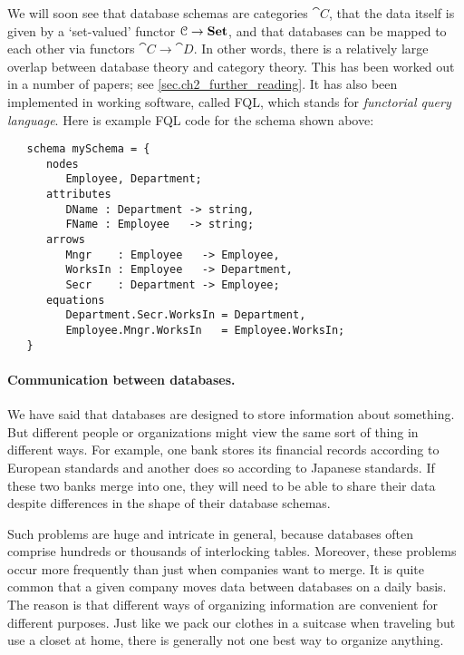 \documentclass[7Sketches]{subfiles}
\begin{document}
We will soon see that database schemas are categories $\cat{C}$, that the data itself is given by a `set-valued' functor $\mathcal{C}\to\mathbf{Set}$, and that databases can be mapped to each other via functors $\cat{C}\to\cat{D}$. In other words, there is a relatively large overlap between database theory and category theory. This has been worked out in a number of papers; see \cref{sec.ch2_further_reading}. It has also been implemented in working software, called FQL, which stands for \emph{functorial query language}. Here is example FQL code for the schema shown above:

\footnotesize
\begin{verbatim}
   schema mySchema = { 
      nodes
         Employee, Department;
      attributes
         DName : Department -> string,
         FName : Employee   -> string;
      arrows
         Mngr    : Employee   -> Employee,
         WorksIn : Employee   -> Department,
         Secr    : Department -> Employee;
      equations  
         Department.Secr.WorksIn = Department,
         Employee.Mngr.WorksIn   = Employee.WorksIn;
   }
\end{verbatim}
\normalsize
%


\paragraph{Communication between databases.}%

We have said that databases are designed to store information about something. But different people or organizations might view the same sort of thing in different ways. For example, one bank stores its financial records according to European standards and another does so according to Japanese standards. If these two banks merge into one, they will need to be able to share their data despite differences in the shape of their database schemas.

Such problems are huge and intricate in general, because databases often comprise hundreds or thousands of interlocking tables. Moreover, these problems occur more frequently than just when companies want to merge. It is quite common that a given company moves data between databases on a daily basis. The reason is that different ways of organizing information are convenient for different purposes. Just like we pack our clothes in a suitcase when traveling but use a closet at home, there is generally not one best way to organize anything.
\end{document}
